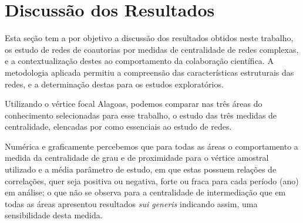 \section{\textbf{Discussão dos Resultados}}

Esta seção tem a por objetivo a discussão dos resultados obtidos neste trabalho, os estudo de redes de coautorias por medidas de centralidade de redes complexas, e a contextualização destes ao comportamento da colaboração científica. A metodologia aplicada permitiu a compreensão das características estruturais das redes, e a determinação destas para os estudos exploratórios.

Utilizando o vértice focal Alagoas, podemos comparar nas três áreas do conhecimento selecionadas para esse trabalho, o estudo das três medidas de centralidade, elencadas por \citep{freeman1991centrality} como essenciais ao estudo de redes.

Numérica e graficamente percebemos que para todas as áreas o comportamento a medida da centralidade de grau e de proximidade para o vértice amostral utilizado e a média parâmetro de estudo, em que estas possuem relações de correlações, quer seja positiva ou negativa, forte ou fraca para cada período (ano) em análise; o que não se observa para a centralidade de intermediação que em todas as áreas apresentou resultados \textit{sui generis} indicando assim, uma sensibilidade desta medida.


	
	
	
